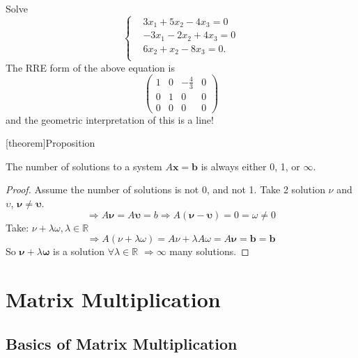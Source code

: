 \documentclass[12pt]{report}
\theoremstyle{definition}
\begin{document}
\begin{ex}
    Solve\[
        \left\{
            \begin{align*}
                & 3x_1 + 5x_2 - 4x_3 = 0 \\
                & -3x_1 - 2x_2 + 4x_3 = 0 \\
                & 6x_2 + x_2 - 8x_3 = 0. \\
            \end{align*}
            \right.
    \]
    The RRE form of the above equation is\[
        \begin{pmatrix}
            1 & 0 & -\frac{4}{3} & 0 \\
            0 & 1 & 0 & 0 \\
            0 & 0 & 0 & 0
        \end{pmatrix} 
    \]
    and the geometric interpretation of this is a line!
\end{ex}

[theorem]{Proposition}
\begin{Solutions to a system is 0, 1, infinity}
    The number of solutions to a system $A\mathbf{x} = \mathbf{b}$ is always either 0, 1, or $\infty$.
\end{Solutions to a system is 0, 1, infinity}

\begin{proof}
    Assume the number of solutions is not 0, and not 1.
    Take 2 solution $\nu$ and $\upsilon$, $\mathbf{\nu} \neq \mathbf{\upsilon}$.\[
        \Rightarrow{} A\mathbf{\nu} = A\mathbf{\upsilon} = b \Rightarrow{}
        A(\mathbf{\nu} - \mathbf{\upsilon}) = 0 = \omega \neq 0
    \]
    Take: $\nu + \lambda \omega, \lambda \in \mathbb{R}$\[
        \Rightarrow{} A(\nu + \lambda\omega) = A\nu + \lambda A\omega = A\mathbf{\nu} = \mathbf{b} = \mathbf{b}
    \]
    So $\mathbf{\nu} + \lambda \mathbf{\omega}$ is a solution $\forall \lambda \in \mathbb{R}$
    $\Rightarrow{} \infty$ many solutions.
\end{proof}

\section{Matrix Multiplication}

\subsection{Basics of Matrix Multiplication}
\end{document}
